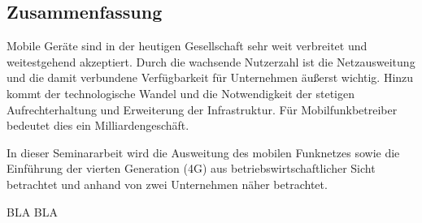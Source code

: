 \subsection*{Zusammenfassung}
\pagestyle{empty}

Mobile Geräte sind in der heutigen Gesellschaft sehr weit verbreitet und weitestgehend akzeptiert. Durch die wachsende Nutzerzahl ist die Netzausweitung und die damit verbundene Verfügbarkeit für Unternehmen äußerst wichtig. Hinzu kommt der technologische Wandel und die Notwendigkeit der stetigen Aufrechterhaltung und Erweiterung der Infrastruktur. Für Mobilfunkbetreiber bedeutet dies ein Milliardengeschäft.

In dieser Seminararbeit wird die Ausweitung des mobilen Funknetzes sowie die Einführung der vierten Generation (4G) aus betriebswirtschaftlicher Sicht betrachtet und anhand von zwei Unternehmen näher betrachtet. 

BLA BLA 